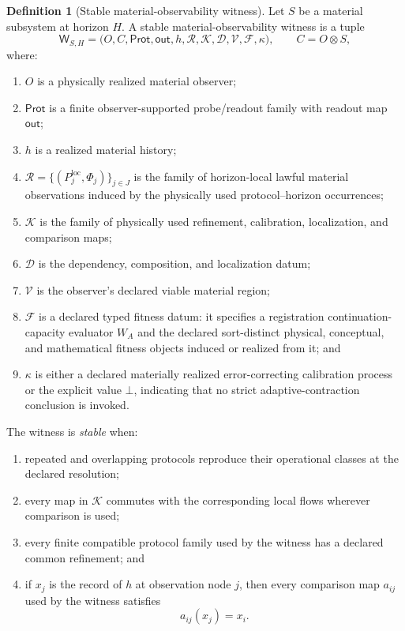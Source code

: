 \documentclass[11pt]{article}
\theoremstyle{definition}
\newtheorem{definition}{Definition}
\begin{document}
\begin{definition}[Stable material-observability witness]
\label{def:stable-material-observability-witness}
Let \(S\) be a material subsystem at horizon \(H\). A stable
material-observability witness is a tuple
\[
\mathsf{W}_{S,H}
=
\bigl(
O,C,\mathsf{Prot},\mathsf{out},h,
\mathcal{R},\mathcal{K},\mathcal{D},\mathcal{V},\mathcal{F},\kappa
\bigr),
\qquad C=O\otimes S,
\]
where:
\begin{enumerate}[label=(W\arabic*)]
\item \(O\) is a physically realized material observer;
\item \(\mathsf{Prot}\) is a finite observer-supported probe/readout family
with readout map \(\mathsf{out}\);
\item \(h\) is a realized material history;
\item \(\mathcal{R}=\{(P^{\mathrm{loc}}_j,\Phi_j)\}_{j\in J}\) is the family
of horizon-local lawful material observations induced by the physically used
protocol--horizon occurrences;
\item \(\mathcal{K}\) is the family of physically used refinement,
calibration, localization, and comparison maps;
\item \(\mathcal{D}\) is the dependency, composition, and localization datum;
\item \(\mathcal{V}\) is the observer's declared viable material region;
\item \(\mathcal{F}\) is a declared typed fitness datum: it specifies a
registration continuation-capacity evaluator \(W_A\) and the declared
sort-distinct physical, conceptual, and mathematical fitness objects induced
or realized from it; and
\item \(\kappa\) is either a declared materially realized error-correcting
calibration process or the explicit value \(\bot\), indicating that no strict
adaptive-contraction conclusion is invoked.
\end{enumerate}

The witness is \emph{stable} when:
\begin{enumerate}[label=(S\arabic*)]
\item repeated and overlapping protocols reproduce their operational classes
at the declared resolution;
\item every map in \(\mathcal{K}\) commutes with the corresponding local
flows wherever comparison is used;
\item every finite compatible protocol family used by the witness has a
declared common refinement; and
\item if \(x_j\) is the record of \(h\) at observation node \(j\), then every
comparison map \(a_{ij}\) used by the witness satisfies
\[
a_{ij}(x_j)=x_i.
\]
\end{enumerate}


\end{definition}
\end{document}
